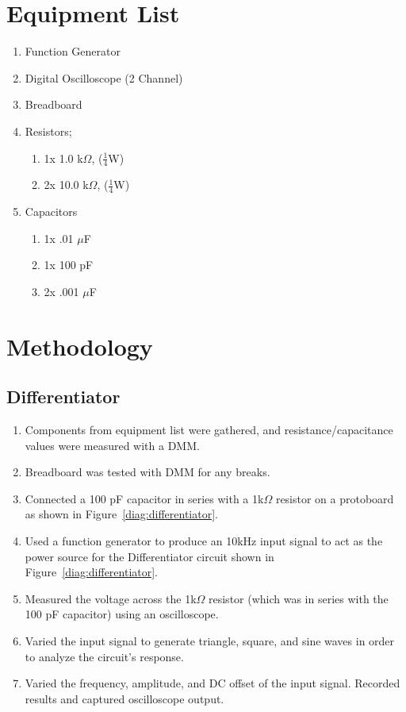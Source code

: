 \documentclass[twocolumn,english]{IEEEtran}
\theoremstyle{plain}
\theoremstyle{plain}
\begin{document}
\section{Equipment List}
	\begin{enumerate}
		\item Function Generator
		\item Digital Oscilloscope (2 Channel)
		\item Breadboard
		\item Resistors;
			\begin{enumerate}
				\item 1x 1.0 k$\Omega$, ($\frac{1}{4}$W)
				\item 2x 10.0 k$\Omega$, ($\frac{1}{4}$W)
			\end{enumerate}
		\item Capacitors
			\begin{enumerate}
				\item 1x .01 $\mu$F
				\item 1x 100 pF
				\item 2x .001 $\mu$F
			\end{enumerate}
	\end{enumerate}

\hrulefill

\section{Methodology}
	\subsection{Differentiator}
	\begin{enumerate}
		\item Components from equipment list were gathered, and resistance/capacitance values were measured with a DMM.
		\item Breadboard was tested with DMM for any breaks.
		\item Connected a 100 pF capacitor in series with a 1k$\Omega$ resistor on a protoboard as shown in Figure~\ref{diag:differentiator}.
		\item Used a function generator to produce an 10kHz input signal to act as the power source for the Differentiator circuit shown in Figure~\ref{diag:differentiator}.
		\item Measured the voltage across the 1k$\Omega$ resistor  (which was in series with the 100 pF capacitor) using an oscilloscope.
		\item Varied the input signal to generate triangle, square, and sine waves in order to analyze the circuit's response.
		\item Varied the frequency, amplitude, and DC offset of the input signal. Recorded results and captured oscilloscope output.
	\end{enumerate}
\end{document}
